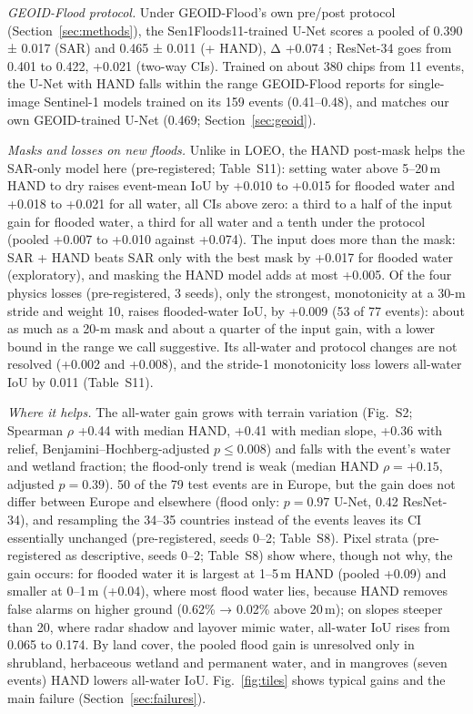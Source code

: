 \emph{GEOID-Flood protocol.} Under GEOID-Flood's own pre/post protocol (Section~\ref{sec:methods}), the
Sen1Floods11-trained U-Net scores a pooled \iouf{} of 0.390 ± 0.017 (SAR) and 0.465 ± 0.011 (+ HAND), Δ
+0.074 ; ResNet-34 goes from 0.401 to 0.422, +0.021  (two-way CIs).
Trained on about 380 chips from 11 events, the U-Net with HAND falls within the range GEOID-Flood reports
for single-image Sentinel-1 models trained on its 159 events (0.41--0.48), and matches our own
GEOID-trained U-Net (0.469; Section~\ref{sec:geoid}).

\emph{Masks and losses on new floods.} Unlike in LOEO, the HAND post-mask helps the SAR-only model here
(pre-registered; Table~S11): setting water above 5--20\,m HAND to dry raises event-mean IoU by +0.010 to
+0.015 for flooded water and +0.018 to +0.021 for all water, all CIs above zero: a third to a half of the
input gain for flooded water, a third for all water and a tenth under the protocol (pooled +0.007 to +0.010
against +0.074). The input does more than the mask: SAR + HAND
beats SAR only with the best mask by +0.017  for flooded water (exploratory), and masking
the HAND model adds at most +0.005. Of the four physics losses (pre-registered, 3 seeds), only the strongest,
monotonicity at a 30-m stride and weight 10, raises flooded-water IoU, by +0.009  (53 of
77 events): about as much as a 20-m mask and about a quarter of the input gain, with a lower bound in the range we
call suggestive. Its all-water and protocol changes are not resolved (+0.002 and +0.008), and the
stride-1 monotonicity loss lowers all-water IoU by 0.011 (Table~S11).


\emph{Where it helps.} The all-water gain grows with terrain variation (Fig.~S2; Spearman $\rho$ +0.44
with median HAND, +0.41 with median slope, +0.36 with relief, Benjamini--Hochberg-adjusted $p \le 0.008$)
and falls with the event's water and wetland fraction; the flood-only trend is weak (median HAND $\rho =
+0.15$, adjusted $p = 0.39$). 50 of the 79 test events are in Europe, but the gain does not differ between
Europe and elsewhere (flood only: $p = 0.97$ U-Net, 0.42 ResNet-34), and resampling the 34--35 countries
instead of the events leaves its CI essentially unchanged (pre-registered, seeds 0--2; Table~S8). Pixel
strata (pre-registered as descriptive, seeds 0--2; Table~S8) show where, though not why, the gain occurs:
for flooded water it is largest at 1--5\,m HAND (pooled +0.09) and smaller at 0--1\,m (+0.04), where most
flood water lies, because HAND removes false alarms on higher ground (0.62\% → 0.02\% above 20\,m); on
slopes steeper than 20\textdegree, where radar shadow and layover mimic water, all-water IoU rises from
0.065 to 0.174. By land cover, the pooled flood gain is unresolved only in shrubland, herbaceous wetland and permanent
water, and in mangroves (seven events) HAND lowers all-water IoU. Fig.~\ref{fig:tiles} shows typical gains and the main
failure (Section~\ref{sec:failures}).

